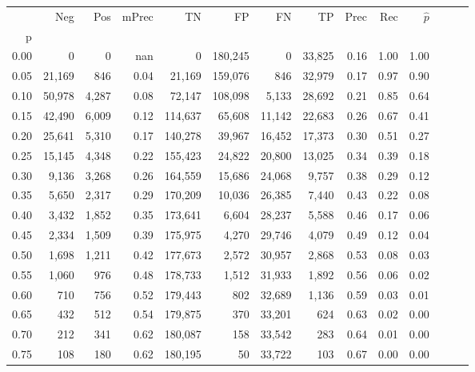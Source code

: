\begin{tabular}{rrrrrrrrrrrrrr}
\toprule
{} &     Neg &    Pos & mPrec &       TN &       FP &      FN &      TP &  Prec &   Rec & $\hat{p}$ \\
p    &         &        &       &          &          &         &         &       &       &           \\
\midrule
0.00 &       0 &      0 &   nan &        0 &  180,245 &       0 &  33,825 &  0.16 &  1.00 &      1.00 \\
0.05 &  21,169 &    846 &  0.04 &   21,169 &  159,076 &     846 &  32,979 &  0.17 &  0.97 &      0.90 \\
0.10 &  50,978 &  4,287 &  0.08 &   72,147 &  108,098 &   5,133 &  28,692 &  0.21 &  0.85 &      0.64 \\
0.15 &  42,490 &  6,009 &  0.12 &  114,637 &   65,608 &  11,142 &  22,683 &  0.26 &  0.67 &      0.41 \\
0.20 &  25,641 &  5,310 &  0.17 &  140,278 &   39,967 &  16,452 &  17,373 &  0.30 &  0.51 &      0.27 \\
0.25 &  15,145 &  4,348 &  0.22 &  155,423 &   24,822 &  20,800 &  13,025 &  0.34 &  0.39 &      0.18 \\
0.30 &   9,136 &  3,268 &  0.26 &  164,559 &   15,686 &  24,068 &   9,757 &  0.38 &  0.29 &      0.12 \\
0.35 &   5,650 &  2,317 &  0.29 &  170,209 &   10,036 &  26,385 &   7,440 &  0.43 &  0.22 &      0.08 \\
0.40 &   3,432 &  1,852 &  0.35 &  173,641 &    6,604 &  28,237 &   5,588 &  0.46 &  0.17 &      0.06 \\
0.45 &   2,334 &  1,509 &  0.39 &  175,975 &    4,270 &  29,746 &   4,079 &  0.49 &  0.12 &      0.04 \\
0.50 &   1,698 &  1,211 &  0.42 &  177,673 &    2,572 &  30,957 &   2,868 &  0.53 &  0.08 &      0.03 \\
0.55 &   1,060 &    976 &  0.48 &  178,733 &    1,512 &  31,933 &   1,892 &  0.56 &  0.06 &      0.02 \\
0.60 &     710 &    756 &  0.52 &  179,443 &      802 &  32,689 &   1,136 &  0.59 &  0.03 &      0.01 \\
0.65 &     432 &    512 &  0.54 &  179,875 &      370 &  33,201 &     624 &  0.63 &  0.02 &      0.00 \\
0.70 &     212 &    341 &  0.62 &  180,087 &      158 &  33,542 &     283 &  0.64 &  0.01 &      0.00 \\
0.75 &     108 &    180 &  0.62 &  180,195 &       50 &  33,722 &     103 &  0.67 &  0.00 &      0.00 \\

\end{tabular}
